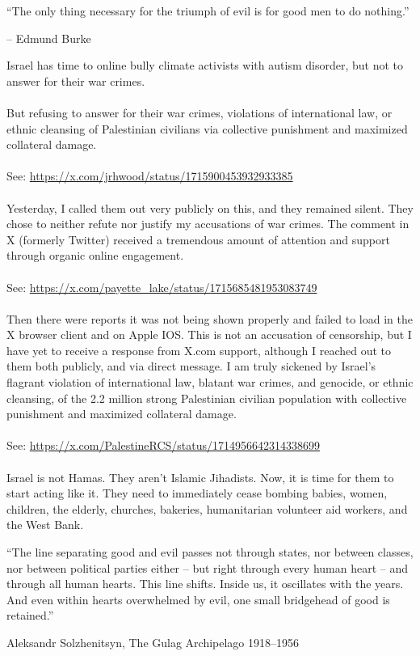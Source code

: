 \documentclass[16pt,openany,oneside]{book}
\begin{document}
\epigraph{“The only thing necessary for the triumph of evil is for good men to do nothing.” 
}{– Edmund Burke}

Israel has time to online bully climate activists with autism disorder, but not to answer for their war crimes.
\\\\
But refusing to answer for their war crimes, violations of international law, or ethnic cleansing of Palestinian civilians via collective punishment and maximized collateral damage.
\\\\
See: \url{https://x.com/jrhwood/status/1715900453932933385}
\\\\
Yesterday, I called them out very publicly on this, and they remained silent. They chose to neither refute nor justify my accusations of war crimes. The comment in X (formerly Twitter) received a tremendous amount of attention and support through organic online engagement.
\\\\
See: \url{https://x.com/payette_lake/status/1715685481953083749}
\\\\
Then there were reports it was not being shown properly and failed to load in the X browser client and on Apple IOS. This is not an accusation of censorship, but I have yet to receive a response from X.com support, although I reached out to them both publicly, and via direct message.
I am truly sickened by Israel's flagrant violation of international law, blatant war crimes, and genocide, or ethnic cleansing, of the 2.2 million strong Palestinian civilian population with collective punishment and maximized collateral damage.
\\\\
See: \url{https://x.com/PalestineRCS/status/1714956642314338699}
\\\\
Israel is not Hamas. They aren't Islamic Jihadists. Now, it is time for them to start acting like it. They need to immediately cease bombing babies, women, children, the elderly, churches, bakeries, humanitarian volunteer aid workers, and the West Bank.

\epigraph{“The line separating good and evil passes not through states, nor between classes, nor between political parties either -- but right through every human heart -- and through all human hearts. This line shifts. Inside us, it oscillates with the years. And even within hearts overwhelmed by evil, one small bridgehead of good is retained.”
}{Aleksandr Solzhenitsyn, The Gulag Archipelago 1918–1956}
\end{document}
